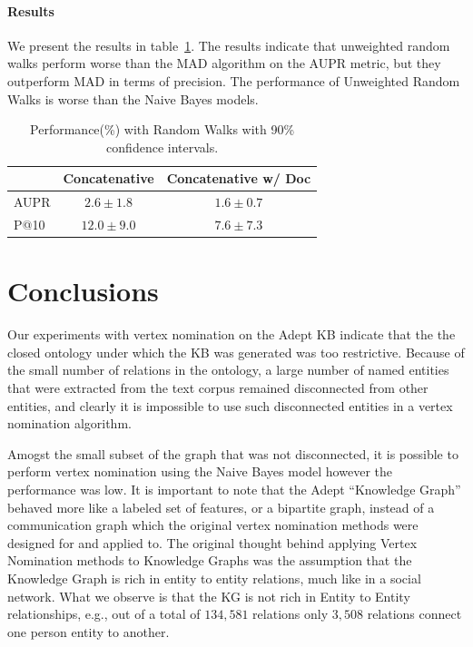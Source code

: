 \documentclass[paper=a4,fontsize=11pt]{scrartcl}
\newcommand{\eg}{e.g.,\xspace}
\newcommand{\tabref}[1]{table~\ref{#1}}
\numberwithin{equation}{section}    %
\numberwithin{figure}{section}      %
\numberwithin{table}{section}       %
\begin{document}
\paragraph{Results} We present the results in \tabref{tab:perf-rw}.
The results indicate that unweighted random walks perform
worse than the MAD algorithm on the AUPR metric, but they outperform MAD in terms of precision.
The performance of Unweighted Random Walks is worse than the Naive Bayes models.
\begin{table}[htbp]
  \centering
  \begin{tabular}{l | c c}
         & Concatenative & Concatenative w/ Doc \\\hline
    AUPR & $ 2.6 \pm 1.8 $       & $ 1.6 \pm 0.7 $      \\
    P@10 & $ 12.0 \pm 9.0 $      & $ 7.6 \pm 7.3 $      \\
  \end{tabular}
  \caption{Performance(\%) with Random Walks with 90\% confidence intervals.}
  \label{tab:perf-rw}
\end{table}


\section{Conclusions}
\label{sec:conclusions}
Our experiments with vertex nomination on the Adept KB indicate that
the the closed ontology under which the KB was generated was too restrictive.
Because of the small number of relations in the ontology, a
large number of named entities that were extracted from the text corpus
remained disconnected from other entities, and clearly it is impossible to
use such disconnected entities in a vertex nomination algorithm.

Amogst the small subset of the graph that was not disconnected, it is possible
to perform vertex nomination using the Naive Bayes model however the performance
was low. It is important to note that the Adept ``Knowledge Graph'' behaved more
like a labeled set of features, or a bipartite graph, instead of a communication
graph which the original vertex nomination methods were designed for and applied
to. {The original thought behind applying Vertex Nomination methods to Knowledge
  Graphs was the assumption that the Knowledge Graph is rich in entity to entity
  relations, much like in a social network. What
we observe is that the KG is not rich in Entity to Entity relationships, \eg out
of a total of $134,581$ relations only $3,508$ relations connect one person
entity to another.}
\end{document}
